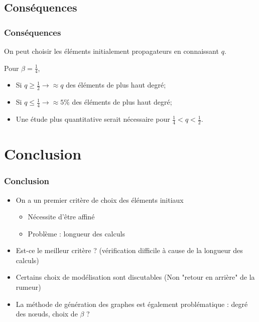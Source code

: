 \documentclass{beamer}
\newcommand{\resultat}[1]{
  \fontsize{8}{10}\selectfont
  \begin{center}
  
  \end{center}
}
\begin{document}

\subsection{Conséquences}
\begin{frame}
  \frametitle{Conséquences}

  \begin{alertblock}{}
  \begin{center}
    On peut choisir les éléments initialement propagateurs en connaissant $q$.
  \end{center}
  \end{alertblock}
  Pour $\beta=\frac{1}{4}$,
  \begin{itemize}
    \item<2-> Si $q \geq \frac{1}{2} \rightarrow \approx q$ des éléments de plus haut degré;
    \item<3-> Si $q \leq \frac{1}{4} \rightarrow \approx 5\%$ des éléments de plus haut degré;
    \item<4-> Une étude plus quantitative serait nécessaire pour $\frac{1}{4} < q < \frac{1}{2}$.
  \end{itemize}
\end{frame}
\section{Conclusion}
\begin{frame}
  \frametitle{Conclusion}
  \begin{itemize}
    \item<1->On a un premier critère de choix des éléments initiaux 
    \begin{itemize}
      \item<2->Nécessite d'être affiné
      \item<3->Problème : longueur des calculs
    \end{itemize}
    \item<4->Est-ce le meilleur critère ? (vérification difficile à cause de la longueur des calculs)
    \item<5->Certains choix de modélisation sont discutables (Non "retour en arrière" de la rumeur)
    \item<6->La méthode de génération des graphes est également problématique : degré des nœuds, choix de $\beta$ ?
  \end{itemize}
\end{frame}
\end{document}
